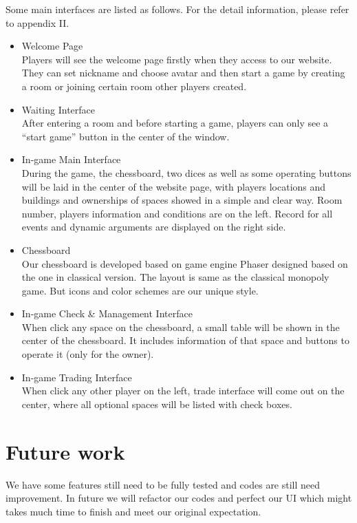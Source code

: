 \documentclass[a4paper,12pt]{article}
\begin{document}
Some main interfaces are listed as follows. For the detail information, please refer to appendix II.
\begin{itemize}
	\item Welcome Page \\
	Players will see the welcome page firstly when they access to our website. They can set nickname and choose avatar and then start a game by creating a room or joining certain room other players created. 
	\item Waiting Interface\\ 
	After entering a room and before starting a game, players can only see a “start game” button in the center of the window.
 	\item In-game Main Interface\\ 
 	During the game, the chessboard, two dices as well as some operating buttons will be laid in the center of the website page, with players locations and buildings and ownerships of spaces showed in a simple and clear way. Room number, players information and conditions are on the left. Record for all events and dynamic arguments are displayed on the right side. 
	\item Chessboard\\ 
	Our chessboard is developed based on game engine Phaser designed based on the one in classical version. The layout is same as the classical monopoly game. But icons and color schemes are our unique style. 
	\item In-game Check \& Management Interface\\ 
	When click any space on the chessboard, a small table will be shown in the center of the chessboard. It includes information of that space and buttons to operate it (only for the owner). 
	\item In-game Trading Interface\\
	When click any other player on the left, trade interface will come out on the center, where all optional spaces will be listed with check boxes.
\end{itemize}

\section{Future work}
We have some features still need to be fully tested and codes are still need improvement. In future we will refactor our codes and perfect our UI which might takes much time to finish and meet our original expectation.
\end{document}
